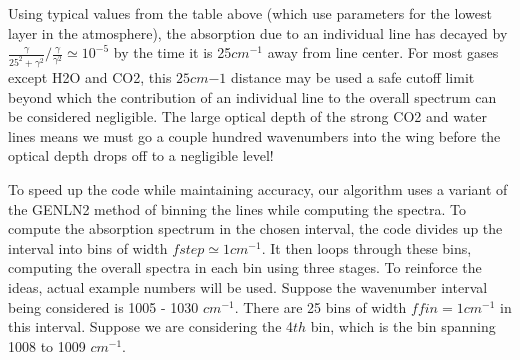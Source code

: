 \documentclass[11pt]{article}
\begin{document}
Using typical values from the table above (which use parameters for the lowest
layer in the atmosphere), the absorption due to an individual line has 
decayed by 
$ \frac{\gamma}{25^{2}+\gamma^{2}}/\frac{\gamma}{\gamma^{2}}\simeq 10^{-5}$
by the time it is 25$cm^{-1}$ away from line center. For most gases
except H2O and CO2, this $25 cm{-1}$ distance may be used a safe cutoff
limit beyond which the contribution of an individual line to the overall
spectrum can be considered negligible.  The large optical depth of the
strong CO2 and water lines means we must go a couple hundred wavenumbers
into the wing before the optical depth drops off to a negligible level!


To speed up the code while maintaining accuracy, our algorithm uses a variant 
of the GENLN2 method of binning the lines while computing the spectra. To 
compute the absorption 
spectrum in the chosen interval, the code divides up the interval into 
bins of width $fstep \simeq 1 cm^{-1}$.  It then loops through these bins, 
computing the overall spectra in each bin using three stages. To reinforce
the ideas, actual example numbers will be used. Suppose the wavenumber
interval being considered is 1005 - 1030 $cm^{-1}$. There are 25 bins of
width $ffin = 1 cm^{-1}$ in this interval. Suppose we are considering the
4$th$ bin, which is the bin spanning 1008 to 1009 $cm^{-1}$.
\end{document}
